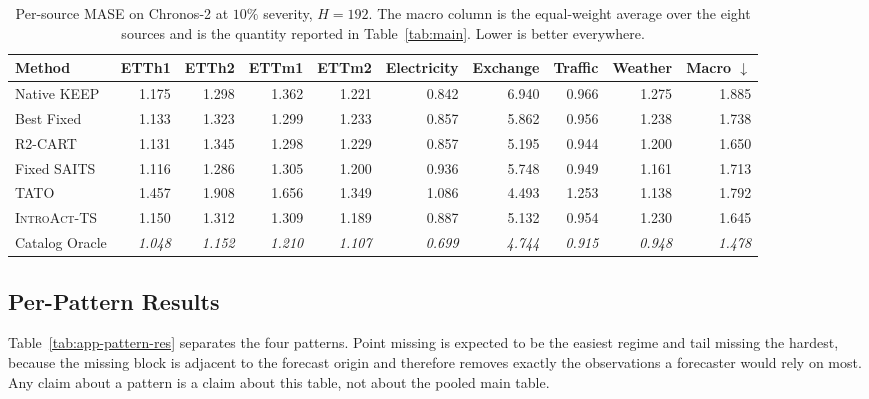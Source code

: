 \documentclass{article}
\newcommand{\oracle}[1]{\textit{\textcolor{phgray}{#1}}}
\newcommand{\introact}{\textsc{IntroAct-TS}}
\begin{document}
\begin{table}[htbp]
  \caption{Per-source MASE on Chronos-2 at $10\%$ severity, $H=192$. The macro column is the
  equal-weight average over the eight sources and is the quantity reported in
  Table~\ref{tab:main}. Lower is better everywhere.}
  \label{tab:app-src-ch2-192}
  \centering
  \small
  \setlength{\tabcolsep}{3pt}
\begin{tabular*}{\textwidth}{@{\extracolsep{\fill}}lrrrrrrrrr@{}}
    \toprule
    Method & ETTh1 & ETTh2 & ETTm1 & ETTm2 & Electricity & Exchange & Traffic & Weather & Macro $\downarrow$ \\
    \midrule
    Native KEEP & 1.175 & 1.298 & 1.362 & 1.221 & 0.842 & 6.940 & 0.966 & 1.275 & 1.885 \\
    Best Fixed & 1.133 & 1.323 & 1.299 & 1.233 & 0.857 & 5.862 & 0.956 & 1.238 & 1.738 \\
    R2-CART & 1.131 & 1.345 & 1.298 & 1.229 & 0.857 & 5.195 & 0.944 & 1.200 & 1.650 \\
    Fixed SAITS & 1.116 & 1.286 & 1.305 & 1.200 & 0.936 & 5.748 & 0.949 & 1.161 & 1.713 \\
    TATO & 1.457 & 1.908 & 1.656 & 1.349 & 1.086 & 4.493 & 1.253 & 1.138 & 1.792 \\
    \midrule
    \rowcolor{bestgray}\introact{} & 1.150 & 1.312 & 1.309 & 1.189 & 0.887 & 5.132 & 0.954 & 1.230 & 1.645 \\
    \midrule
    Catalog Oracle & \oracle{1.048} & \oracle{1.152} & \oracle{1.210} & \oracle{1.107} & \oracle{0.699} & \oracle{4.744} & \oracle{0.915} & \oracle{0.948} & \oracle{1.478} \\
    \bottomrule
  \end{tabular*}
\end{table}

\subsection{Per-Pattern Results}
\label{app:pattern}
Table~\ref{tab:app-pattern-res} separates the four patterns. Point missing is expected to
be the easiest regime and tail missing the hardest, because the missing block is adjacent
to the forecast origin and therefore removes exactly the observations a forecaster would
rely on most. Any claim about a pattern is a claim about this table, not about the pooled
main table.
\end{document}
